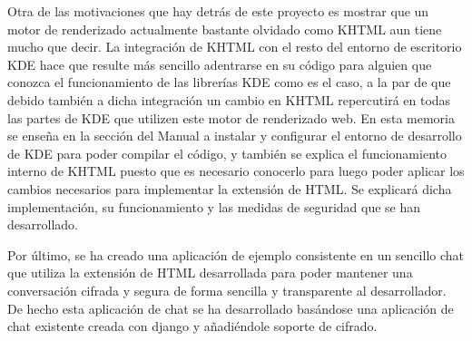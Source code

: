 Otra de las motivaciones que hay detrás de este proyecto es mostrar que un motor de renderizado actualmente bastante olvidado como KHTML aun tiene mucho que decir. La integración de KHTML con el resto del entorno de escritorio KDE hace que resulte más sencillo adentrarse en su código para alguien que conozca el funcionamiento de las librerías KDE como es el caso, a la par de que debido también a dicha integración un cambio en KHTML repercutirá en todas las partes de KDE que utilizen este motor de renderizado web. En esta memoria se enseña en la sección del Manual a instalar y configurar el entorno de desarrollo de KDE para poder compilar el código, y también se explica el funcionamiento interno de KHTML puesto que es necesario conocerlo para luego poder aplicar los cambios necesarios para implementar la extensión de HTML. Se explicará dicha implementación, su funcionamiento y las medidas de seguridad que se han desarrollado.

Por último, se ha creado una aplicación de ejemplo consistente en un sencillo chat que utiliza la extensión de HTML desarrollada para poder mantener una conversación cifrada y segura de forma sencilla y transparente al desarrollador. De hecho esta aplicación de chat se ha desarrollado basándose una aplicación de chat existente creada con django y añadiéndole soporte de cifrado.